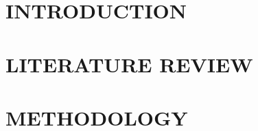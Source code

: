 \documentclass[a4paper,13pt,3p,twoside]{report}
\theoremstyle{definition}
\begin{document}
\renewcommand{\listtablename}{LIST OF TABLES}
{\let\oldnumberline\numberline
\renewcommand{\numberline}{Table~\oldnumberline}
\listoftables}

\glsaddall 
\renewcommand*{\acronymname}{LIST OF ABBREVIATIONS}
\renewcommand*{\entryname}{Abbreviation}
\renewcommand*{\descriptionname}{Definition}
\printnoidxglossaries


\renewcommand{\figurename}{Figure}
\renewcommand{\tablename}{Table}
\renewcommand{\chaptername}{CHAPTER}



\newpage
{}

\pagestyle{fancy}
\fancyhf{}
\fancyhead[RE, LO]{\leftmark}
\fancyfoot[LE, RO]{\thepage}

\chapter*{INTRODUCTION}

\renewcommand{\thesection}{\arabic{section}}
\renewcommand{\thesubsection}{\arabic{section}.\arabic{subsection}}



\renewcommand{\thesection}{\thechapter.\arabic{section}}
\renewcommand{\thesubsection}{\thechapter.\arabic{section}.\arabic{subsection}}

\newpage
\chapter{LITERATURE REVIEW}



\newpage
\chapter{METHODOLOGY}

\end{document}
